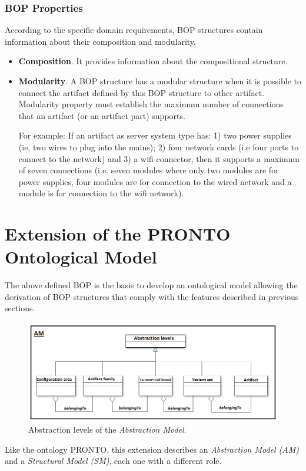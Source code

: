 \documentclass[runningheads,a4paper]{llncs}
\begin{document}
\subsubsection{BOP Properties}
According to the specific domain requirements, BOP structures contain information about their composition and modularity. 
\begin{itemize}
\item \textbf{Composition}. It provides information about the compositional structure. 
\item \textbf{Modularity}. A BOP structure has a modular structure when it is possible to connect the artifact defined by this BOP structure to other artifact. Modularity property must establish the maximum number of connections that an artifact (or an artifact part) supports. 

For example: If an artifact as server system type has: 1) two power supplies (ie, two wires to plug into the mains); 2) four network cards (i.e four ports to connect to the network) and 3) a wifi connector, then it supports a maximum of seven connections (i.e. seven modules where only two modules are for power supplies, four modules are for connection to the wired network and a module is for connection to the wifi network). 
\end{itemize} 

\section{Extension of the PRONTO Ontological Model} \label{M}
The above defined BOP is the basis to develop an ontological model allowing the derivation of BOP structures that comply with the features described in previous sections.
\begin{figure}[H]
\centering
\includegraphics[scale=0.5]{AM.png}
\caption{Abstraction levels of the \textit{Abstraction Model}.}\label{AM}
\end{figure}

Like the ontology PRONTO\cite{vegetti2011pronto}, this extension describes an \textit{Abstraction Model (AM)} and a \textit{Structural Model (SM)}, each one with a different role. 
\end{document}
